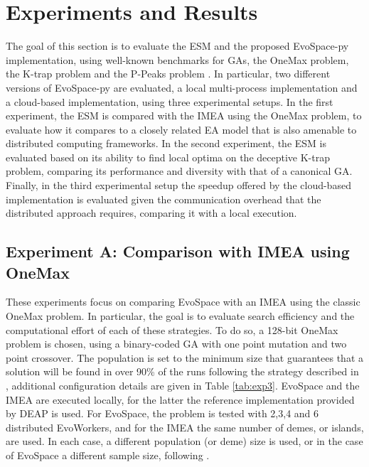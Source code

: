 \section{Experiments and Results}
\label{sec:exp1}
The goal of this section is to evaluate the ESM and the proposed EvoSpace-py implementation, using well-known benchmarks for GAs,
the OneMax problem, the K-trap problem \cite{trap} and the P-Peaks problem \cite{Jong:PS97}.
In particular, two different versions of EvoSpace-py are evaluated, a local multi-process implementation and a cloud-based implementation,
using three experimental setups.
In the first experiment, the ESM is compared with the IMEA using the OneMax problem, to evaluate how it compares to a closely related EA model that is also
amenable to distributed computing frameworks.
In the second experiment, the ESM is evaluated based on its ability to find local optima on the deceptive K-trap problem,
comparing its performance and diversity with that of a canonical GA.
Finally, in the third experimental setup the speedup offered by the cloud-based implementation is evaluated given the communication overhead
that the distributed approach requires, comparing it with a local execution.


\subsection{Experiment A: Comparison with IMEA using OneMax}
These experiments focus on comparing EvoSpace with an IMEA using the classic OneMax problem.
In particular, the goal is to evaluate search efficiency and the computational effort of each of these strategies.
To do so, a 128-bit OneMax problem is chosen, using a binary-coded GA with one point mutation and two point crossover.
The population is set to the minimum size that guarantees that
a solution will be found in over 90\% of the runs following the strategy described in \cite{nodeo},
additional configuration details are given in Table \ref{tab:exp3}.
EvoSpace and the IMEA are executed locally, for the latter the reference implementation provided by DEAP is used.
For EvoSpace, the problem is tested with 2,3,4 and 6 distributed EvoWorkers,
and for the IMEA the same number of demes, or islands, are used. In each case, a different population (or deme) size is used, or in 
the case of EvoSpace a different sample size, following \cite{nodeo}.

